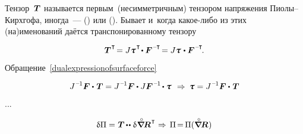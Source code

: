 \begin{otherlanguage}{russian}
\vspace{-0.2em} Тензор~${\hspace{.1ex}\bm{T}}$ называется первым~(несимметричным) тензором напряжения Пиолы--Кирхгофа, иногда~---  () или  (). Бывает и~когда какое\hbox{-}либо из этих (на)именований даётся транспонированному тензору

\nopagebreak\vspace{-0.1em}\begin{equation*}
\firstpiolakirchhoffstress^{\hspace{.1ex}\T} \hspace{-0.32ex}
= J \cauchystress^{\hspace{.16ex}\T} \hspace{-0.32ex} \dotp \bm{F}^{\hspace{.1ex}\expminusT} \hspace{-0.32ex}
= J \cauchystress \hspace{.16ex} \dotp \bm{F}^{\hspace{.1ex}\expminusT} \hspace{-0.25ex}.
\end{equation*}

Обращение~\eqref{dualexpressionofsurfaceforce}

\begin{equation*}
J^{\hspace{.12ex}\expminusone} \bm{F} \dotp \hspace{.16ex} \firstpiolakirchhoffstress = J^{\hspace{.12ex}\expminusone} \bm{F} \dotp J \bm{F}^{\hspace{.16ex}\expminusone} \hspace{-0.2ex} \dotp \cauchystress
\:\,\Rightarrow\:
\cauchystress = J^{\hspace{.12ex}\expminusone} \bm{F} \dotp \hspace{.16ex} \firstpiolakirchhoffstress
\end{equation*}

...



\nopagebreak\vspace{-0.2em}\begin{equation}
\variation{\Pi} = \hspace{.1ex} \firstpiolakirchhoffstress \hspace{-0.12ex} \dotdotp \hspace{.1ex} \variation{\hspace{.1ex} \boldnablacircled \hspace{-0.16ex} \bm{R}^{\hspace{0.12ex}\T}}
\hspace{.1ex} \Rightarrow \hspace{.32ex}
\Pi \hspace{-0.32ex}=\hspace{-0.25ex} \Pi(\boldnablacircled \hspace{-0.16ex} \bm{R}\hspace{.1ex})
\end{equation}


\end{otherlanguage}
